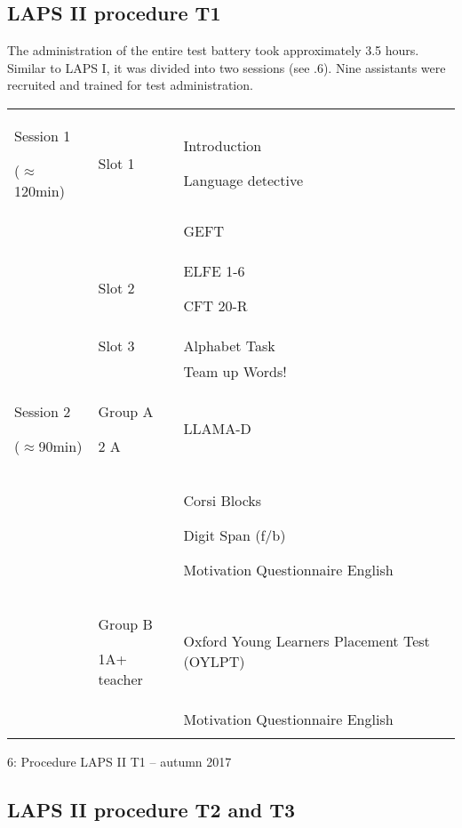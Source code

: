 \documentclass[output=paper]{langsci/langscibook}
\begin{document}
 \subsection{LAPS II procedure T1}

The administration of the entire test battery took approximately 3.5 hours. Similar to LAPS I, it was divided into two sessions (see .6). Nine assistants were recruited and trained for test administration.


\begin{tabularx}{\textwidth}{XXX}

\lsptoprule

Session 1

(${\approx}$120min) & Slot 1 & Introduction

Language detective\\
&  & GEFT\\
& Slot 2 & ELFE 1-6

CFT 20-R\\
& Slot 3 & Alphabet Task\\
&  & Team up Words!\\
Session 2

(${\approx}$90min) & Group A 

2 A & LLAMA-D\\
&  & Corsi Blocks

Digit Span (f/b)

Motivation Questionnaire English\\
& Group B

1A+ teacher & Oxford Young Learners Placement Test (OYLPT)\\
&  & Motivation Questionnaire English\\
\lspbottomrule
\end{tabularx}
\begin{table}
\caption{6: Procedure LAPS II T1 – autumn 2017}
\label{tab:02:2}
\end{table}

 \subsection{LAPS II procedure T2 and T3}
\end{document}
